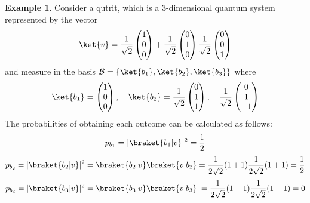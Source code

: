 \documentclass[12pt, oneside]{book}
\theoremstyle{definition}
\theoremstyle{definition}
\newtheorem{example}{Example}[section]
\theoremstyle{remark}
\begin{document}
\begin{example}
    Consider a qutrit, which is a 3-dimensional quantum system represented by the vector
    \[
    \ket{v}=\frac{1}{\sqrt{2}}\begin{pmatrix} 1 \\ 0 \\ 0\end{pmatrix} + \frac{1}{\sqrt{2}}\begin{pmatrix} 0 \\ 1 \\ 0\end{pmatrix}\frac{1}{\sqrt{2}}\begin{pmatrix} 0 \\ 0 \\ 1\end{pmatrix}
    \]
    and measure in the basis $\mathcal{B}=\{\ket{b_1},\ket{b_2},\ket{b_3}\}$ where
    \[
    \ket{b_1}=\begin{pmatrix} 1 \\ 0 \\ 0 \end{pmatrix}, \quad \ket{b_2} = \frac{1}{\sqrt{2}}\begin{pmatrix} 0 \\ 1 \\ 1 \end{pmatrix}, \quad \frac{1}{\sqrt{2}}\begin{pmatrix} 0 \\ 1 \\ -1 \end{pmatrix} 
    \]
    The probabilities of obtaining each outcome can be calculated as follows:
    \[
    p_{b_1}=|\braket{b_1|v}|^2=\frac{1}{2}
    \]
    \[
    p_{b_2}=|\braket{b_2|v}|^2=\braket{b_2|v}\braket{v|b_2}=\frac{1}{2\sqrt{2}}(1+1)\frac{1}{2\sqrt{2}}(1+1)=\frac{1}{2}
    \]
    \[
    p_{b_3}=|\braket{b_3|v}|^2=\braket{b_3|v}\braket{v|b_3}|=\frac{1}{2\sqrt{2}}(1-1)\frac{1}{2\sqrt{2}}(1-1)=0
    \]
\end{example}
\end{document}
